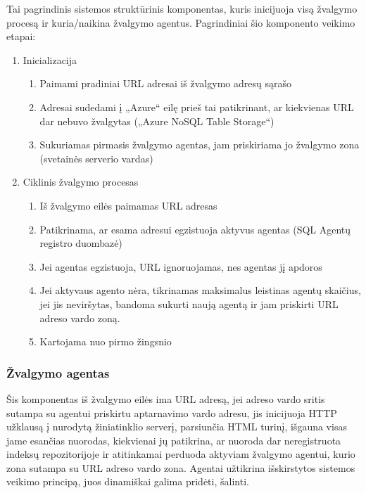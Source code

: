  Tai pagrindinis sistemos struktūrinis komponentas, kuris inicijuoja visą žvalgymo procesą ir kuria/naikina žvalgymo agentus. Pagrindiniai šio komponento veikimo etapai:
 \begin{enumerate}
     \item Inicializacija
     \begin{enumerate}
         \item Paimami pradiniai URL adresai iš žvalgymo adresų sąrašo
         \item Adresai sudedami į „Azure“ eilę prieš tai patikrinant, ar kiekvienas URL dar nebuvo žvalgytas („Azure NoSQL Table Storage“)
         \item Sukuriamas pirmasis žvalgymo agentas, jam priskiriama jo žvalgymo zona (svetainės serverio vardas)
     \end{enumerate}
     \item Ciklinis žvalgymo procesas
     \begin{enumerate}
         \item Iš žvalgymo eilės paimamas URL adresas
         \item Patikrinama, ar esama adresui egzistuoja aktyvus agentas (SQL Agentų registro duombazė)
         \item Jei agentas egzistuoja, URL ignoruojamas, nes agentas jį apdoros
         \item Jei aktyvaus agento nėra, tikrinamas maksimalus leistinas agentų skaičius, jei jis neviršytas, bandoma sukurti naują agentą ir jam priskirti URL adreso vardo zoną.
         \item Kartojama nuo pirmo žingsnio
     \end{enumerate}
 \end{enumerate}
 
 \subsubsection{Žvalgymo agentas}

Šis komponentas iš žvalgymo eilės ima URL adresą, jei adreso vardo sritis sutampa su agentui priskirtu aptarnavimo vardo adresu, jis inicijuoja HTTP užklausą į nurodytą žiniatinklio serverį, parsiunčia HTML turinį, išgauna visas jame esančias nuorodas, kiekvienai jų patikrina, ar nuoroda dar neregistruota indeksų repozitorijoje ir atitinkamai perduoda aktyviam žvalgymo agentui, kurio zona sutampa su URL adreso vardo zona. Agentai užtikrina išskirstytos sistemos veikimo principą, juos dinamiškai galima pridėti, šalinti.

